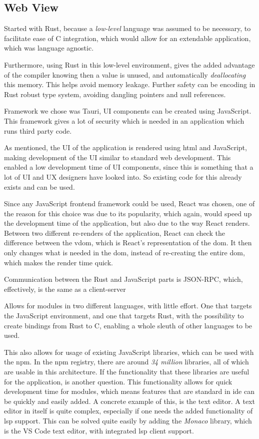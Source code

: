 \subsection{Web View}

Started with Rust, because a \textit{low-level} language was assumed to be
necessary, to facilitate ease of C integration, which would allow for an
extendable application, which was language agnostic.

Furthermore, using Rust in this low-level environment, gives the added advantage
of the compiler knowing then a value is unused, and automatically
\textit{deallocating} this memory. This helps avoid memory leakage. Further
safety can be encoding in Rust robust type system, avoiding dangling pointers
and null references.

Framework we chose was Tauri, UI components can be created using JavaScript. This
framework gives a lot of security which is needed in an application which runs
third party code.

As mentioned, the UI of the application is rendered using \gls{html} and
JavaScript, making development of the UI similar to standard web development.
This enabled a low development time of UI components, since this is something
that a lot of UI and UX designers have looked into. So existing code for this
already exists and can be used.

Since any JavaScript frontend framework could be used, React was chosen, one of
the reason for this choice was due to its popularity, which again, would speed
up the development time of the application, but also due to the way React
renders. Between two different re-renders of the application, React can check
the difference between the \gls{vdom}, which is React's representation of the
\gls{dom}. It then only changes what is needed in the \gls{dom}, instead of
re-creating the entire \gls{dom}, which makes the render time quick.

Communication between the Rust and JavaScript parts is JSON-RPC, which,
effectively, is the same as a client-server

Allows for modules in two different languages, with little effort. One that
targets the JavaScript environment, and one that targets Rust, with the
possibility to create bindings from Rust to C, enabling a whole sleuth of other
languages to be used.

This also allows for usage of existing JavaScript libraries, which can be used
with the \gls{npm}. In the \gls{npm} registry, there are around
\textit{34 million} libraries, all of which are usable in this architecture. If
the functionality that these libraries are useful for the application, is
another question. This functionality allows for quick development time for
modules, which means features that are standard in \gls{ide} can be quickly and
easily added. A concrete example of this, is the text editor. A text editor in
itself is quite complex, especially if one needs the added functionality of
\gls{lsp} support. This can be solved quite easily by adding the \textit{Monaco}
library, which is the VS Code text editor, with integrated \gls{lsp} client
support.

